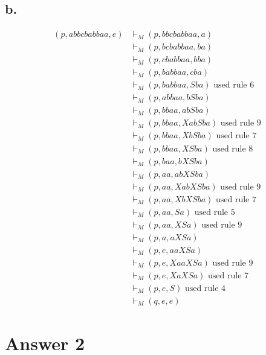 \documentclass[12pt]{article}
\begin{document}
\subsection*{b.}
\begin{align*}
    (p, abbcbabbaa, e) &\vdash_M (p, bbcbabbaa, a)\\
    &\vdash_M (p,bcbabbaa, ba)\\
    &\vdash_M (p,cbabbaa, bba)\\
    &\vdash_M (p,babbaa,cba)\\
    &\vdash_M (p,babbaa,Sba)\text{ used rule 6}\\
    &\vdash_M (p,abbaa,bSba)\\
    &\vdash_M (p,bbaa,abSba)\\
    &\vdash_M (p,bbaa,XabSba)\text{ used rule 9}\\
    &\vdash_M (p,bbaa,XbSba)\text{ used rule 7}\\
    &\vdash_M (p,bbaa,XSba)\text{ used rule 8}\\
    &\vdash_M (p,baa, bXSba)\\
    &\vdash_M (p,aa,abXSba)\\
    &\vdash_M (p,aa,XabXSba)\text{ used rule 9}\\
    &\vdash_M (p,aa,XbXSba)\text{ used rule 7}\\
    &\vdash_M (p,aa,Sa)\text{ used rule 5}\\
    &\vdash_M (p,aa,XSa)\text{ used rule 9}\\
    &\vdash_M (p,a,aXSa)\\
    &\vdash_M (p,e,aaXSa)\\
    &\vdash_M (p,e,XaaXSa)\text{ used rule 9}\\
    &\vdash_M (p,e,XaXSa)\text{ used rule 7}\\
    &\vdash_M (p,e,S)\text{ used rule 4}\\
    &\vdash_M (q,e,e)
\end{align*}


\section*{Answer 2}
\end{document}
